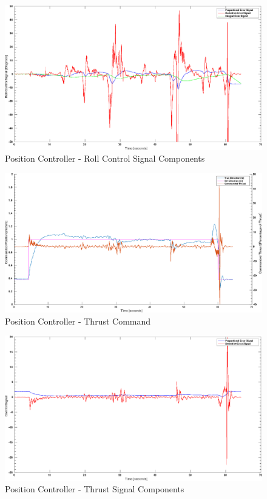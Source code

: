 \documentclass[11pt, twocolumn]{article}
\begin{document}
\begin{figure}
	\centering
	\includegraphics[width=\textwidth]{images/PID_Roll_Controls.eps}
	\caption{Position Controller - Roll Control Signal Components}
	\label{fig:pid_pitch_error}
\end{figure}

\begin{figure}
	\centering
	\includegraphics[width=\textwidth]{images/PID_Elevation_True_and_obs.eps}
	\caption{Position Controller - Thrust Command}
	\label{fig:pid_thrust_command}
\end{figure}

\begin{figure}
	\centering
	\includegraphics[width=\textwidth]{images/PID_Elevation_Controls.eps}
	\caption{Position Controller - Thrust Signal Components}
	\label{fig:pid_thrust_error}
\end{figure}
\end{document}
